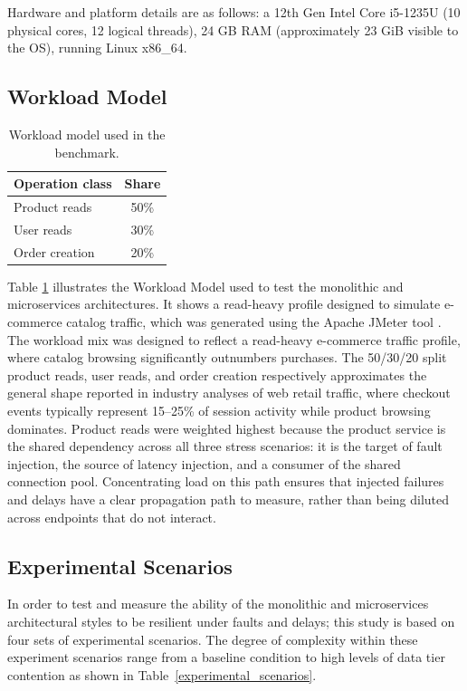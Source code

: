 \documentclass[smallextended,natbib]{svjour3}
\begin{document}
Hardware and platform details are as follows: a 12th Gen Intel Core i5-1235U (10 physical cores, 12 logical threads), 24 GB RAM (approximately 23 GiB visible to the OS), running Linux x86\_64.

\subsection{Workload Model}

\begin{table}[ht]
	\caption{Workload model used in the benchmark.}
	\centering
	\begin{tabular}{l c}
		\toprule
		Operation class & Share \\
		\midrule
		Product reads   & 50\%  \\
		User reads      & 30\%  \\
		Order creation  & 20\%  \\
		\bottomrule
	\end{tabular}
	\label{workload_model}
\end{table}

Table \ref{workload_model} illustrates the Workload Model used to test the monolithic and microservices architectures. It shows a read-heavy profile designed to simulate e-commerce catalog traffic, which was generated using the Apache JMeter tool \cite{jmeter}. The workload mix was designed to reflect a read-heavy e-commerce traffic profile, where catalog browsing significantly outnumbers purchases. The 50/30/20 split product reads, user reads, and order creation respectively approximates the general shape reported in industry analyses of web retail traffic, where checkout events typically represent 15--25\% of session activity while product browsing dominates. Product reads were weighted highest because the product service is the shared dependency across all three stress scenarios: it is the target of fault injection, the source of latency injection, and a consumer of the shared connection pool. Concentrating load on this path ensures that injected failures and delays have a clear propagation path to measure, rather than being diluted across endpoints that do not interact.

\subsection{Experimental Scenarios}

In order to test and measure the ability of the monolithic and microservices architectural styles to be resilient under faults and delays; this study is based on four sets of experimental scenarios. The degree of complexity within these experiment scenarios range from a baseline condition to high levels of data tier contention as shown in Table~\ref{experimental_scenarios}.
\end{document}
